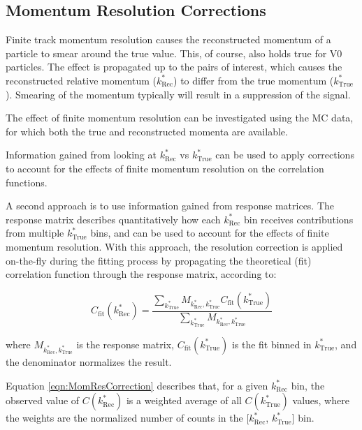 \documentclass[ALICE,manyauthors]{cernphprep}
\newcommand{\ktrue}{$k^{*}_{\mathrm{True}}$\xspace}
\newcommand{\krec}{$k^{*}_{\mathrm{Rec}}$\xspace}
\begin{document}
\subsection{Momentum Resolution Corrections}
\label{MomentumResolutionCorrections}

Finite track momentum resolution causes the reconstructed momentum of a particle to smear around the true value.
This, of course, also holds true for V0 particles.
The effect is propagated up to the pairs of interest, which causes the reconstructed relative momentum (\krec) to differ from the true momentum (\ktrue).
Smearing of the momentum typically will result in a suppression of the signal.

The effect of finite momentum resolution can be investigated using the MC data, for which both the true and reconstructed momenta are available.

Information gained from looking at \krec vs \ktrue can be used to apply corrections to account for the effects of finite momentum resolution on the correlation functions.



A second approach is to use information gained from response matrices.
The response matrix describes quantitatively how each \krec bin receives contributions from multiple \ktrue bins, and can be used to account for the effects of finite momentum resolution.
With this approach, the resolution correction is applied on-the-fly during the fitting process by propagating the theoretical (fit) correlation function through the response matrix, according to:  

\begin{equation}
  C_{\mathrm{fit}}(k^{*}_{\mathrm{Rec}}) = \dfrac{\sum\limits_{k^{*}_{\mathrm{True}}}M_{k^{*}_{\mathrm{Rec}},k^{*}_{\mathrm{True}}}C_{\mathrm{fit}}(k^{*}_{\mathrm{True}})}{\sum\limits_{k^{*}_{\mathrm{True}}}M_{k^{*}_{\mathrm{Rec}},k^{*}_{\mathrm{True}}}}
\label{eqn:MomResCorrection}
\end{equation}

where $M_{k^{*}_{\mathrm{Rec}},k^{*}_{\mathrm{True}}}$ is the response matrix, $C_{\mathrm{fit}}(k^{*}_{\mathrm{True}})$ is the fit binned in \ktrue, and the denominator normalizes the result.

Equation \ref{eqn:MomResCorrection} describes that, for a given \krec bin, the observed value of $C(k^{*}_{\mathrm{Rec}})$ is a weighted average of all $C(k^{*}_{\mathrm{True}})$ values, where the weights are the normalized number of counts in the [\krec, \ktrue] bin.
\end{document}
